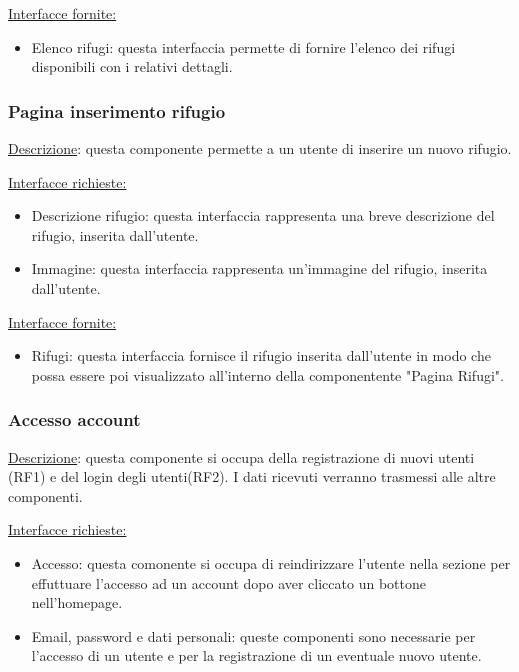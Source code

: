 \documentclass[a4paper,12pt]{article}
\begin{document}
\underline{Interfacce fornite:}
\begin{itemize}
\item Elenco rifugi: questa interfaccia permette di fornire l'elenco dei rifugi disponibili con i relativi dettagli.
\end{itemize}



\subsubsection{Pagina inserimento rifugio}
\underline{Descrizione}: questa componente permette a un utente di inserire un nuovo rifugio.

\underline{Interfacce richieste:}
\begin{itemize}
\item Descrizione rifugio: questa interfaccia rappresenta una breve descrizione del rifugio, inserita dall'utente.
\item Immagine: questa interfaccia rappresenta un'immagine del rifugio, inserita dall'utente.
\end{itemize}

\underline{Interfacce fornite:}
\begin{itemize}
\item Rifugi: questa interfaccia fornisce il rifugio inserita dall'utente in modo che possa essere poi visualizzato all'interno della componentente "Pagina Rifugi".
\end{itemize}



\subsubsection{Accesso account}
\underline{Descrizione}: questa componente si occupa della registrazione di nuovi utenti (RF1) e del login degli utenti(RF2). I dati ricevuti verranno trasmessi alle altre componenti.

\underline{Interfacce richieste:} 
\begin{itemize}
    \item Accesso: questa comonente si occupa di reindirizzare l'utente nella sezione per effuttuare l'accesso ad un account dopo aver cliccato un bottone nell'homepage.
    \item Email, password e dati personali: queste componenti sono necessarie per l'accesso di un utente e per la registrazione di un eventuale nuovo utente.
\end{itemize}
\end{document}
